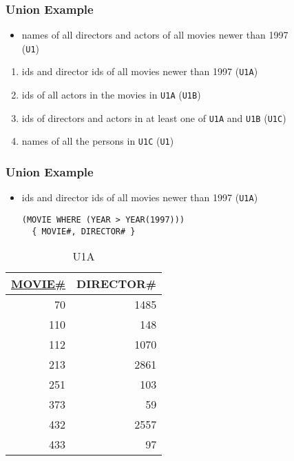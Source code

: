 \documentclass[dvipsnames]{beamer}
\theoremstyle{plain}
\begin{document}
\begin{frame}
  \frametitle{Union Example}

  \begin{itemize}
    \item names of all directors and actors of all movies newer than 1997\\
      (\texttt{U1})
  \end{itemize}

  \pause
  \begin{enumerate}
    \item ids and director ids of all movies newer than 1997 (\texttt{U1A})

    \pause
    \item ids of all actors in the movies in \texttt{U1A} (\texttt{U1B})

    \pause
    \item ids of directors and actors in at least one of
      \texttt{U1A} and \texttt{U1B} (\texttt{U1C})

    \pause
    \item names of all the persons in \texttt{U1C} (\texttt{U1})
  \end{enumerate}
\end{frame}

\begin{frame}[fragile]
  \frametitle{Union Example}

  \begin{itemize}
    \item ids and director ids of all movies newer than 1997 (\texttt{U1A})
    \begin{lstlisting}
(MOVIE WHERE (YEAR > YEAR(1997)))
  { MOVIE#, DIRECTOR# }
    \end{lstlisting}
  \end{itemize}

  \vspace{-10pt}
  \begin{tiny}
  \begin{table}
    \caption{U1A}
    \begin{tabular}{|r|r|}\hline
\underline{MOVIE\#} & DIRECTOR\#\\[2pt]\hline\hline
 70 &       1485\\\hline
110 &        148\\\hline
112 &       1070\\\hline
213 &       2861\\\hline
251 &        103\\\hline
373 &         59\\\hline
432 &       2557\\\hline
433 &         97\\\hline
    \end{tabular}
  \end{table}
  \end{tiny}
\end{frame}
\end{document}
